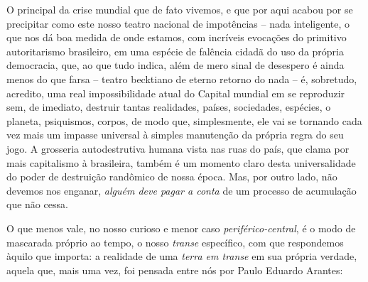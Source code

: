 O principal da crise mundial que de fato vivemos, e que por aqui acabou
por se precipitar como este nosso teatro nacional de impotências -- nada
inteligente, o que nos dá boa medida de onde estamos, com incríveis
evocações do primitivo autoritarismo brasileiro, em uma espécie de
falência cidadã do uso da própria democracia, que, ao que tudo indica,
além de mero sinal de desespero é ainda menos do que farsa -- teatro
becktiano de eterno retorno do nada -- é, sobretudo, acredito, uma real
impossibilidade atual do Capital mundial em se reproduzir sem, de
imediato, destruir tantas realidades, países, sociedades, espécies, o
planeta, psiquismos, corpos, de modo que, simplesmente, ele vai se
tornando cada vez mais um impasse universal à simples manutenção da
própria regra do seu jogo. A grosseria autodestrutiva humana vista nas
ruas do país, que clama por mais capitalismo à brasileira, também é um
momento claro desta universalidade do poder de destruição randômico de
nossa época. Mas, por outro lado, não devemos nos enganar, \emph{alguém
deve pagar a conta} de um processo de acumulação que não cessa.

O que menos vale, no nosso curioso e menor caso
\emph{periférico-central}, é o modo de mascarada próprio ao tempo, o
nosso \emph{transe} específico, com que respondemos àquilo que importa:
a realidade de uma \emph{terra em transe} em sua própria verdade, aquela
que, mais uma vez, foi pensada entre nós por Paulo Eduardo Arantes:


